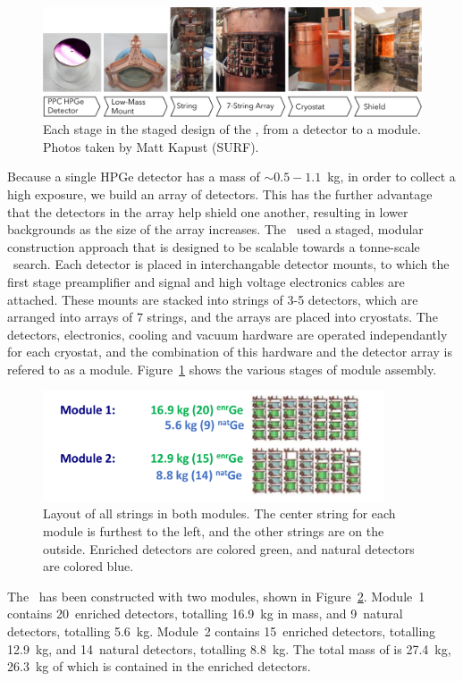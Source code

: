 \documentclass[/main.tex]{subfiles}
\begin{document}
\begin{figure}[h]
  \centering
  \includegraphics[width=\textwidth]{Modular_Design}
  \caption[Modular design of the \MJD]{\label{fig:modulardesign}
    Each stage in the staged design of the \MJD, from a detector to a module. Photos taken by Matt Kapust (SURF).
  }
\end{figure}
Because a single HPGe detector has a mass of ${\sim}0.5-1.1$~kg, in order to collect a high exposure, we build an array of detectors.
This has the further advantage that the detectors in the array help shield one another, resulting in lower backgrounds as the size of the array increases.
The \MJD\ used a staged, modular construction approach that is designed to be scalable towards a tonne-scale \znbb\ search.
Each detector is placed in interchangable detector mounts, to which the first stage preamplifier and signal and high voltage electronics cables are attached.
These mounts are stacked into strings of 3-5 detectors, which are arranged into arrays of 7 strings, and the arrays are placed into cryostats.
The detectors, electronics, cooling and vacuum  hardware are operated independantly for each cryostat, and the combination of this hardware and the detector array is refered to as a module.
Figure~\ref{fig:modulardesign} shows the various stages of module assembly.

\begin{figure}[h]
  \centering
  \includegraphics[width=0.9\textwidth]{modules}
  \caption[Layout of all strings in both modules with natural and enriched detectors labelled]{ \label{fig:modules}
    Layout of all strings in both modules. The center string for each module is furthest to the left, and the other strings are on the outside. Enriched detectors are colored green, and natural detectors are colored blue.
  }
\end{figure}
The \MJD\ has been constructed with two modules, shown in Figure~\ref{fig:modules}.
Module~1 contains 20~enriched detectors, totalling 16.9~kg in mass, and 9~natural detectors, totalling 5.6~kg.
Module~2 contains 15~enriched detectors, totalling 12.9~kg, and 14~natural detectors, totalling 8.8~kg.
The total mass of  is 27.4~kg, 26.3~kg of which is contained in the enriched detectors.
\end{document}
